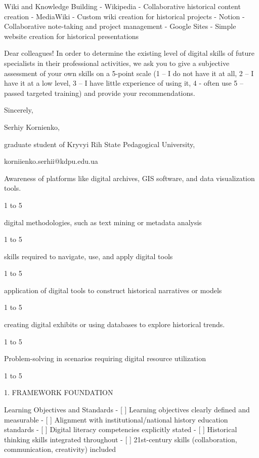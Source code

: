 \begin{appendices}
  Wiki and Knowledge Building
-  Wikipedia  - Collaborative historical content creation
-  MediaWiki  - Custom wiki creation for historical projects
-  Notion  - Collaborative note-taking and project management
-  Google Sites  - Simple website creation for historical presentations

\label{quest}

Dear colleagues!
In order to determine the existing level of digital skills of future specialists in their professional activities, we ask you to give a subjective assessment of your own skills on a 5-point scale (1 – I do not have it at all, 2 – I have it at a low level, 3 – I have little experience of using it, 4 - often use 5 – passed targeted training) and provide your recommendations.

Sincerely,

Serhiy Kornienko,

graduate student of Kryvyi Rih State Pedagogical University,

korniienko.serhii@kdpu.edu.ua



Awareness of platforms like digital archives, GIS software, and data visualization tools.

1 to 5


 digital methodologies, such as text mining or metadata analysis

1 to 5


skills required to navigate, use, and apply digital tools

1 to 5


application of digital tools to construct historical narratives or models

1 to 5


creating digital exhibits or using databases to explore historical trends.

1 to 5


Problem-solving in scenarios requiring digital resource utilization

1 to 5

\label{frmw_chklst}

   1. FRAMEWORK FOUNDATION

    Learning Objectives and Standards
- [ ] Learning objectives clearly defined and measurable
- [ ] Alignment with institutional/national history education standards
- [ ] Digital literacy competencies explicitly stated
- [ ] Historical thinking skills integrated throughout
- [ ] 21st-century skills (collaboration, communication, creativity) included


\end{appendices}
